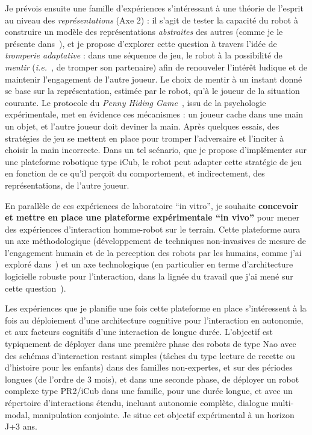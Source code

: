 \documentclass[a4paper]{article}
\newcommand{\ie}{{\textit{i.e.~}}}
\begin{document}
Je prévois ensuite une famille d'expériences s'intéressant à une théorie de
l'esprit au niveau des \emph{représentations} (Axe 2) : il s'agit de tester la
capacité du robot à construire un modèle des représentations \emph{abstraites}
des autres (comme je le présente dans~\cite{lemaignan2015mutual}), et je propose
d'explorer cette question à travers l'idée de \emph{tromperie adaptative} : dans
une séquence de jeu, le robot à la possibilité de \emph{mentir} (\ie, de tromper
son partenaire) afin de renouveler l'intérêt ludique et de maintenir
l'engagement de l'autre joueur. Le choix de mentir à un instant donné se base sur
la représentation, estimée par le robot, qu'à le joueur de la situation
courante. Le protocole du \emph{Penny Hiding Game}~\cite{oswald1989role}, issu
de la psychologie expérimentale, met en évidence ces mécanismes : un joueur
cache dans une main un objet, et l'autre joueur doit deviner la main.  Après
quelques essais, des stratégies de jeu se mettent en place pour tromper
l'adversaire et l'inciter à choisir la main incorrecte. Dans un tel scénario,
que je propose d'implémenter sur une plateforme robotique type iCub, le robot
peut adapter cette stratégie de jeu en fonction de ce qu'il perçoit du
comportement, et indirectement, des représentations, de l'autre joueur.

En parallèle de ces expériences de laboratoire ``in vitro'', je souhaite
\textbf{concevoir et mettre en place une plateforme expérimentale ``in vivo''}
pour mener des expériences d'interaction homme-robot sur le terrain. Cette
plateforme aura un axe méthodologique (développement de techniques non-invasives
de mesure de l'engagement humain et de la perception des robots par les humains,
comme j'ai exploré
dans~\cite{lemaignan2014dynamics,lemaignan2014cognitive,fink2014dynamics,sharma2015measuring})
et un axe technologique (en particulier en terme d'architecture logicielle
robuste pour l'interaction, dans la lignée du travail que j'ai mené sur cette
question~\cite{lemaignan2014human,lemaignan2015pyrobots}).

Les expériences que je planifie une fois cette plateforme en place s'intéressent
à la fois au déploiement d'une architecture cognitive pour l'interaction en
autonomie, et aux facteurs cognitifs d'une interaction de longue durée.
L'objectif est typiquement de déployer dans une première phase des robots de
type Nao avec des schémas d'interaction restant simples (tâches du type lecture
de recette ou d'histoire pour les enfants) dans des familles non-expertes, et
sur des périodes longues (de l'ordre de 3 mois), et dans une seconde phase, de
déployer un robot complexe type PR2/iCub dans une famille, pour une durée
longue, et avec un répertoire d'interactions étendu, incluant autonomie
complète, dialogue multi-modal, manipulation conjointe. Je situe cet objectif
expérimental à un horizon J+3 ans.
\end{document}
